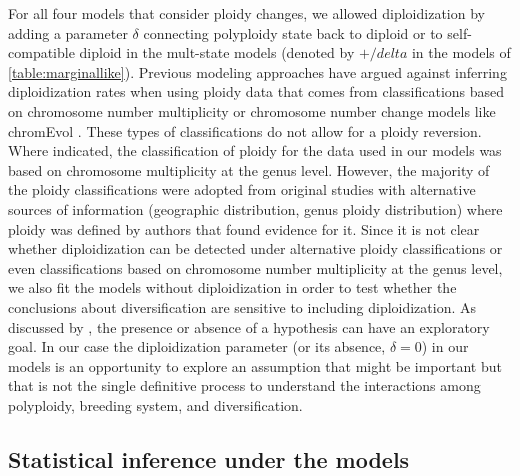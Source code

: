 For all four models that consider ploidy changes, we allowed diploidization by adding a parameter $\delta$ connecting polyploidy state back to diploid or to self-compatible diploid in the mult-state models (denoted by $+/delta$ in the models of  \cref{table:marginallike}).
Previous modeling approaches \citep{mayrose_2011} have argued against inferring diploidization rates when using ploidy data that comes from classifications based on chromosome number multiplicity or chromosome number change models like chromEvol \citep{mayrose_2010}.
These types of classifications do not allow for a ploidy reversion.
Where indicated, the classification of ploidy for the data used in our models was based on chromosome multiplicity at the genus level.
However, the majority of the ploidy classifications were adopted from original studies with alternative sources of information (\eg geographic distribution, genus ploidy distribution) where ploidy was defined by authors that found evidence for it.
Since it is not clear whether diploidization can be detected under alternative ploidy classifications or even classifications based on chromosome number multiplicity at the genus level, we also fit the models without diploidization in order to test  whether the conclusions about diversification are sensitive to including diploidization.
As discussed by \citet{servedio_2014}, the presence or absence of a hypothesis can have an exploratory goal.
In our case the diploidization parameter (or its absence, $\delta=0$) in our models is an opportunity to explore an assumption that might be important but that is not the single definitive process to understand the interactions among polyploidy, breeding system, and diversification.

\subsection{Statistical inference under the models}

